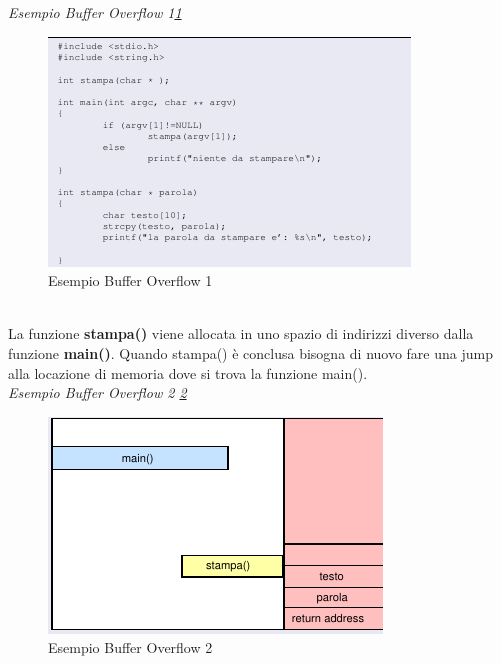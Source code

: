 \documentclass[12pt]{article}
\begin{document}
				\textit{Esempio Buffer Overflow 1\ref{fig:37}}\\
				\begin{figure}[h!]
					\centering
					\includegraphics[scale=0.90]{img/c.PNG}
					\caption{Esempio Buffer Overflow 1 \label{fig:37}}
				\end{figure}\\
				
				La funzione \textbf{stampa()} viene allocata in uno spazio di indirizzi diverso dalla funzione \textbf{main()}. Quando stampa() è conclusa bisogna di nuovo fare una jump alla locazione di memoria dove si trova la funzione main().\\
				
				\textit{Esempio Buffer Overflow 2 \ref{fig:38}}\\
				\begin{figure}[h!]
					\centering
					\includegraphics[scale=0.90]{img/stack.PNG}
					\caption{Esempio Buffer Overflow 2\label{fig:38}}
				\end{figure}\\
				
\end{document}
